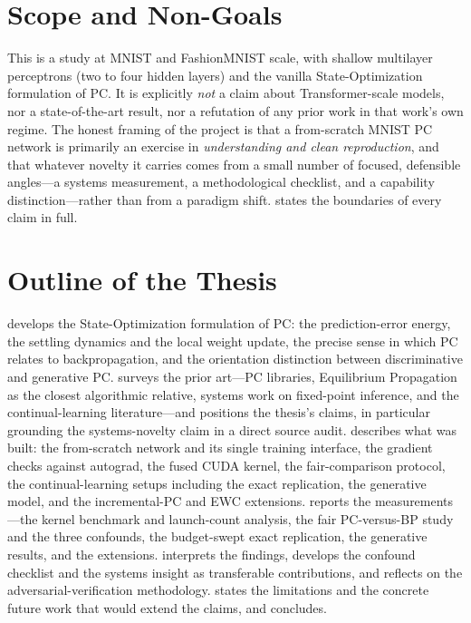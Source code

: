 \section{Scope and Non-Goals}

This is a study at MNIST and FashionMNIST scale, with shallow multilayer perceptrons (two to four
hidden layers) and the vanilla State-Optimization formulation of PC. It is explicitly \emph{not}
a claim about Transformer-scale models, nor a state-of-the-art result, nor a refutation of any
prior work in that work's own regime. The honest framing of the project is that a from-scratch
MNIST PC network is primarily an exercise in \emph{understanding and clean reproduction}, and
that whatever novelty it carries comes from a small number of focused, defensible
angles---a systems measurement, a methodological checklist, and a capability distinction---rather
than from a paradigm shift.  states the boundaries of every claim in full.

\section{Outline of the Thesis}

 develops the State-Optimization formulation of PC: the prediction-error
energy, the settling dynamics and the local weight update, the precise sense in which PC relates
to backpropagation, and the orientation distinction between discriminative and generative PC.
 surveys the prior art---PC libraries, Equilibrium Propagation as the closest
algorithmic relative, systems work on fixed-point inference, and the continual-learning
literature---and positions the thesis's claims, in particular grounding the systems-novelty claim
in a direct source audit.  describes what was built: the from-scratch network and
its single training interface, the gradient checks against autograd, the fused CUDA kernel, the
fair-comparison protocol, the continual-learning setups including the exact replication, the
generative model, and the incremental-PC and EWC extensions.  reports the
measurements---the kernel benchmark and launch-count analysis, the fair PC-versus-BP study and the
three confounds, the budget-swept exact replication, the generative results, and the extensions.
 interprets the findings, develops the confound checklist and the systems
insight as transferable contributions, and reflects on the adversarial-verification methodology.
 states the limitations and the concrete future work that would extend the
claims, and  concludes.
